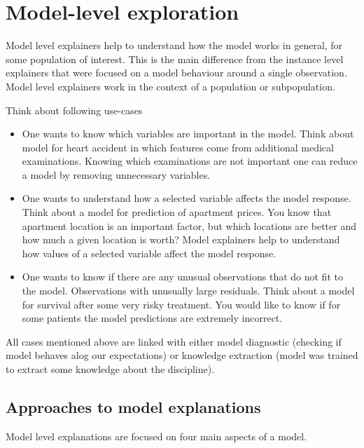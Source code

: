 \documentclass[12pt,]{krantz}
\providecommand{\tightlist}{%
  \setlength{\itemsep}{0pt}\setlength{\parskip}{0pt}}
\theoremstyle{definition}
\theoremstyle{definition}
\theoremstyle{definition}
\theoremstyle{remark}
\begin{document}
\hypertarget{modelLevelExploration}{%
\section{Model-level exploration}\label{modelLevelExploration}}

Model level explainers help to understand how the model works in
general, for some population of interest. This is the main difference
from the instance level explainers that were focused on a model
behaviour around a single observation. Model level explainers work in
the context of a population or subpopulation.

Think about following use-cases

\begin{itemize}
\tightlist
\item
  One wants to know which variables are important in the model. Think
  about model for heart accident in which features come from additional
  medical examinations. Knowing which examinations are not important one
  can reduce a model by removing unnecessary variables.
\item
  One wants to understand how a selected variable affects the model
  response. Think about a model for prediction of apartment prices. You
  know that apartment location is an important factor, but which
  locations are better and how much a given location is worth? Model
  explainers help to understand how values of a selected variable affect
  the model response.
\item
  One wants to know if there are any unusual observations that do not
  fit to the model. Observations with unusually large residuals. Think
  about a model for survival after some very risky treatment. You would
  like to know if for some patients the model predictions are extremely
  incorrect.
\end{itemize}

All cases mentioned above are linked with either model diagnostic
(checking if model behaves alog our expectations) or knowledge
extraction (model was trained to extract some knowledge about the
discipline).

\hypertarget{approaches-to-model-explanations}{%
\subsection{Approaches to model
explanations}\label{approaches-to-model-explanations}}

Model level explanations are focused on four main aspects of a model.
\end{document}
